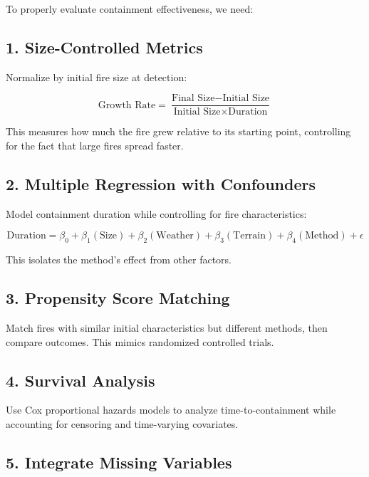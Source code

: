 \documentclass[11pt,a4paper]{article}
\begin{document}
To properly evaluate containment effectiveness, we need:

\subsection{1. Size-Controlled Metrics}

Normalize by initial fire size at detection:

\begin{equation}
\text{Growth Rate} = \frac{\text{Final Size} - \text{Initial Size}}{\text{Initial Size} \times \text{Duration}}
\end{equation}

This measures how much the fire grew relative to its starting point, controlling for the fact that large fires spread faster.

\subsection{2. Multiple Regression with Confounders}

Model containment duration while controlling for fire characteristics:

\begin{equation}
\text{Duration} = \beta_0 + \beta_1(\text{Size}) + \beta_2(\text{Weather}) + \beta_3(\text{Terrain}) + \beta_4(\text{Method}) + \epsilon
\end{equation}

This isolates the method's effect from other factors.

\subsection{3. Propensity Score Matching}

Match fires with similar initial characteristics but different methods, then compare outcomes. This mimics randomized controlled trials.

\subsection{4. Survival Analysis}

Use Cox proportional hazards models to analyze time-to-containment while accounting for censoring and time-varying covariates.

\subsection{5. Integrate Missing Variables}
\end{document}
